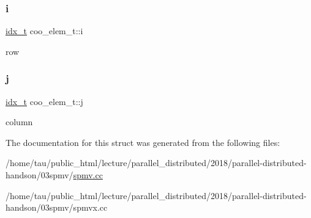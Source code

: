 \subsubsection{\texorpdfstring{i}{i}}
{\footnotesize\ttfamily \hyperlink{spmv_8cc_a8e93478a00e685bea5e6a3f617bf03a3}{idx\+\_\+t} coo\+\_\+elem\+\_\+t\+::i}

row \mbox{\label{structcoo__elem__t_a45a4cd1c7ffe70ddd75dff7c764bbfc6}} 
\subsubsection{\texorpdfstring{j}{j}}
{\footnotesize\ttfamily \hyperlink{spmv_8cc_a8e93478a00e685bea5e6a3f617bf03a3}{idx\+\_\+t} coo\+\_\+elem\+\_\+t\+::j}

column 

The documentation for this struct was generated from the following files\+:\begin{DoxyCompactItemize}
\item 
/home/tau/public\+\_\+html/lecture/parallel\+\_\+distributed/2018/parallel-\/distributed-\/handson/03spmv/\hyperlink{spmv_8cc}{spmv.\+cc}\item 
/home/tau/public\+\_\+html/lecture/parallel\+\_\+distributed/2018/parallel-\/distributed-\/handson/03spmv/spmvx.\+cc\end{DoxyCompactItemize}
